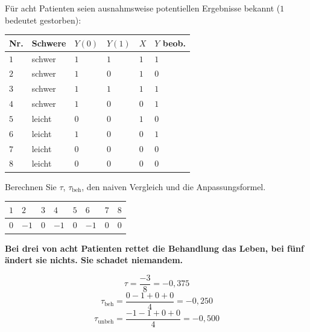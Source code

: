 \begin{aufgabe}
Für acht Patienten seien ausnahmsweise  potentiellen Ergebnisse bekannt ($1$ bedeutet gestorben):
\begin{center}
{\small
\renewcommand{\arraystretch}{1.44}
\begin{tabular}{@{}P{1.2cm}P{1.8cm}P{1.2cm}P{1.2cm}P{1.0cm}P{1.4cm}@{}}
\toprule
\textbf{Nr.} & \textbf{Schwere} & $Y(0)$ & $Y(1)$ & $X$ & \textbf{$Y$ beob.}\\
\midrule
$1$ & schwer & $1$ & $1$ & $1$ & $1$\\
$2$ & schwer & $1$ & $0$ & $1$ & $0$\\
$3$ & schwer & $1$ & $1$ & $1$ & $1$\\
$4$ & schwer & $1$ & $0$ & $0$ & $1$\\
$5$ & leicht & $0$ & $0$ & $1$ & $0$\\
$6$ & leicht & $1$ & $0$ & $0$ & $1$\\
$7$ & leicht & $0$ & $0$ & $0$ & $0$\\
$8$ & leicht & $0$ & $0$ & $0$ & $0$\\
\bottomrule
\end{tabular}}
\end{center}
Berechnen Sie $\tau$, $\tau_{\text{beh}}$, den naiven Vergleich und die Anpassungsformel.

\loesung
{}
\begin{center}
{\small
\renewcommand{\arraystretch}{1.44}
\begin{tabular}{@{}P{1.2cm}P{1.2cm}P{1.2cm}P{1.2cm}P{1.2cm}P{1.2cm}P{1.2cm}P{1.2cm}@{}}
\toprule
$1$ & $2$ & $3$ & $4$ & $5$ & $6$ & $7$ & $8$\\
\midrule
$0$ & $-1$ & $0$ & $-1$ & $0$ & $-1$ & $0$ & $0$\\
\bottomrule
\end{tabular}}
\end{center}

\begin{center}
\begin{minipage}{0.9\textwidth}
\textbf{Bei drei von acht Patienten rettet die Behandlung das Leben, bei fünf ändert sie nichts. Sie schadet niemandem.}
\end{minipage}
\end{center}

\[ \tau = \frac{-3}{8} = -0{,}375 \]
\[ \tau_{\text{beh}} = \frac{0-1+0+0}{4} = -0{,}250 \]
\[ \tau_{\text{unbeh}} = \frac{-1-1+0+0}{4} = -0{,}500 \]


\end{aufgabe}
